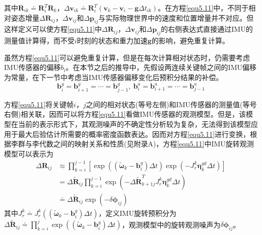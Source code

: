 其中$\boldsymbol{R}_{ik} \doteq \boldsymbol{R}_i^T \boldsymbol{R}_k$，$\Delta \boldsymbol{v}_{ik} \doteq \boldsymbol{R}_i^T \left( \boldsymbol{v}_k -\boldsymbol{v}_i-\boldsymbol{g}\Delta t_{ik} \right)$。在方程\eqref{equ5.11}中，不同于相对姿态增量$\Delta \boldsymbol{R}_{ij}$，$\Delta \boldsymbol{v}_{ij}$和$\Delta \boldsymbol{p}_{ij}$与实际物理世界中的速度和位置增量并不对应。但这样定义可以使方程\eqref{equ5.11}中$\Delta \boldsymbol{R}_{ij}$，$\Delta \boldsymbol{v}_{ij}$和$\Delta \boldsymbol{p}_{ij}$的右侧表达式直接通过IMU的测量值计算得，而不受$i$时刻的状态和重力加速$\boldsymbol{g}$的影响，避免重复计算。

虽然方程\eqref{equ5.11}可以避免重复计算，但是在每次计算相对状态时，仍需要考虑IMU传感器的偏移$b_i$。在本节之后的推导中，先假设两连续关键帧之间的IMU偏移为常量，在下一节中考虑当IMU传感器偏移变化后预积分结果的补偿。
\begin{equation}
\label{equ5.12}
\boldsymbol{b}_i^g = \boldsymbol{b}_{i+1}^g = \cdots = \boldsymbol{b}_{j-1}^g, \  \boldsymbol{b}_i^a = \boldsymbol{b}_{i+1}^a = \cdots = \boldsymbol{b}_{j-1}^a
\end{equation}

方程\eqref{equ5.11}将关键帧$i$，$j$之间的相对状态(等号左侧)和IMU传感器的测量值(等号右侧)相关联，因而可以将方程\eqref{equ5.11}看做IMU传感器的观测模型。但是，该模型在当前的表示形式下，其观测噪声的不确定性分析较为复杂，无法得到该模型应用于最大后验估计所需要的概率密度函数表达。因而对方程\eqref{equ5.11}进行变换，根据李群与李代数之间的映射关系和性质(见附录A)，方程\eqref{equ5.11}中IMU旋转观测模型可以表示为
\begin{equation}
\label{equ5.13}
\begin{aligned}
\Delta \boldsymbol{R}_{ij} & \approx \prod\limits_{k=i}^{j-1} \left[ \exp \left( \left(  \widetilde{\boldsymbol{\omega}}_k - \boldsymbol{b}_i^g \right) \Delta t  \right)  
\exp \left(  -J_r^k \boldsymbol{\eta}_k^{gd} \Delta t  \right)\right] \\
&= \Delta \widetilde{\boldsymbol{R}}_{ij} \prod\limits_{k=i}^{j-1}\exp \left( -\Delta \widetilde{\boldsymbol{R}}_{k+1j}^T  J_r^k \boldsymbol{\eta}_k^{gd} \Delta t  \right) \\ 
& \doteq \Delta \widetilde{\boldsymbol{R}}_{ij} \exp \left(  -\delta \boldsymbol{\phi}_{ij}  \right)
\end{aligned}
\end{equation}
其中$J_r^k \doteq J_r^k( \left( \widetilde{\boldsymbol{\omega}}_k - \boldsymbol{b}_i^g \right) \Delta t)$，定义IMU旋转预积分为$\Delta \widetilde{\boldsymbol{R}}_{ij} \doteq \prod_{k=i}^j\exp \left( \left( \widetilde{\boldsymbol{\omega}}_k - \boldsymbol{b}_i^g \right) \Delta t  \right)$，观测模型中的旋转观测噪声为$\delta \boldsymbol{\phi}_{ij}$。

